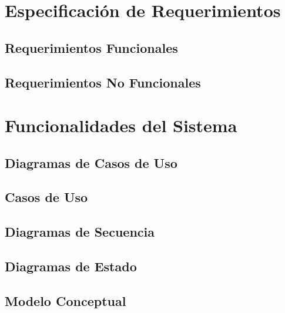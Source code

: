 \section{Especificación de Requerimientos}
\label{sc:ER}


\subsection{Requerimientos Funcionales}
\label{ssc:RF}


\subsection{Requerimientos No Funcionales}
\label{ssc:RNF}
\section{Funcionalidades del Sistema}
\label{sc:FS}


\subsection{Diagramas de Casos de Uso}
\label{ssc:DCU}


\subsection{Casos de Uso}
\label{ssc:CU}

\subsection{Diagramas de Secuencia}
\label{ssc:DSS}

\subsection{Diagramas de Estado}
\label{ssc:DE}


\subsection{Modelo Conceptual}
\label{ssc:MC}